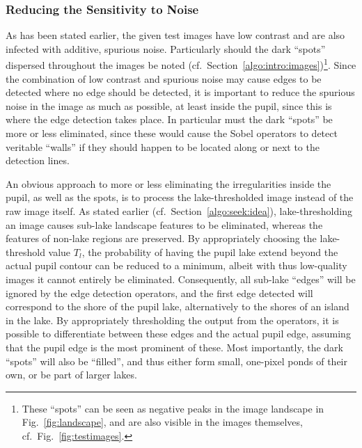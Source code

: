 \subsubsection{Reducing the Sensitivity to Noise}


As has been stated earlier, the given test images have low contrast
and are also infected with additive, spurious noise.  Particularly
should the dark ``spots'' dispersed throughout the images be noted
(cf.\ Section~\ref{algo:intro:images})\footnote{These ``spots'' can be
  seen as negative peaks in the image landscape in
  Fig.~\ref{fig:landscape}, and are also visible in the images
  themselves, cf.\ Fig.~\ref{fig:testimages}.}.  Since the combination
of low contrast and spurious noise may cause edges to be detected
where no edge should be detected, it is important to reduce the
spurious noise in the image as much as possible, at least inside the
pupil, since this is where the edge detection takes place.
In particular must the dark ``spots'' be more or less eliminated,
since these would cause the Sobel operators to detect veritable
``walls'' if they should happen to be located along or next to the
detection lines.

An obvious approach to more or less eliminating the irregularities
inside the pupil, as well as the spots, is to process the
lake-thresholded image instead of the raw image itself.  As stated
earlier (cf.\ Section~\ref{algo:seek:idea}), lake-thresholding an
image causes sub-lake landscape features to be eliminated, whereas the
features of non-lake regions are preserved.  By appropriately choosing
the lake-threshold value $T_{l}$, the probability of having the pupil
lake extend beyond the actual pupil contour can be reduced to a
minimum, albeit with thus low-quality images it cannot entirely be
eliminated.  Consequently, all sub-lake ``edges'' will be ignored by
the edge detection operators, and the first edge detected will
correspond to the shore of the pupil lake, alternatively to the shores
of an island in the lake.  By appropriately thresholding the output
from the operators, it is possible to differentiate between these
edges and the actual pupil edge, assuming that the pupil edge is the
most prominent of these.  Most importantly, the dark ``spots'' will
also be ``filled'', and thus either form small, one-pixel ponds of
their own, or be part of larger lakes.

